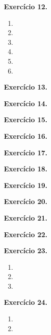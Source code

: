 \documentclass[12pt,a4paper]{article}
\begin{document}
\vspace{0.5cm}
\noindent\textbf{Exercício 12.}
\begin{enumerate}
    \renewcommand{\theenumi}{\alph{enumi}}
    \renewcommand{\labelenumi}{\theenumi)}
    \item 
    \item 
    \item 
    \item 
    \item 
    \item 
\end{enumerate}

\vspace{0.5cm}
\noindent\textbf{Exercício 13.}

\vspace{0.5cm}
\noindent\textbf{Exercício 14.}

\vspace{0.5cm}
\noindent\textbf{Exercício 15.}

\vspace{0.5cm}
\noindent\textbf{Exercício 16.}

\vspace{0.5cm}
\noindent\textbf{Exercício 17.}

\vspace{0.5cm}
\noindent\textbf{Exercício 18.}

\vspace{0.5cm}
\noindent\textbf{Exercício 19.}

\vspace{0.5cm}
\noindent\textbf{Exercício 20.}

\vspace{0.5cm}
\noindent\textbf{Exercício 21.}

\vspace{0.5cm}
\noindent\textbf{Exercício 22.}

\vspace{0.5cm}
\noindent\textbf{Exercício 23.}
\begin{enumerate}
    \renewcommand{\theenumi}{\alph{enumi}}
    \renewcommand{\labelenumi}{\theenumi)}
    \item 
    \item 
    \item 
\end{enumerate}

\vspace{0.5cm}
\noindent\textbf{Exercício 24.}
\begin{enumerate}
    \renewcommand{\theenumi}{\alph{enumi}}
    \renewcommand{\labelenumi}{\theenumi)}
    \item 
    \item 
\end{enumerate}
\end{document}
